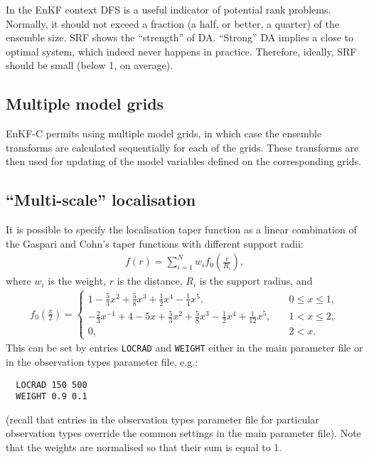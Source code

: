 \documentclass[11pt]{report}
\begin{document}
In the EnKF context DFS is a useful indicator of potential rank problems.
Normally, it should not exceed a fraction (a half, or better, a quarter) of the ensemble size.
SRF shows the ``strength'' of DA.
``Strong'' DA implies a close to optimal system, which indeed never happens in practice.
Therefore, ideally, SRF should be small (below 1, on average).

\subsection{Multiple model grids}

EnKF-C permits using multiple model grids, in which case the ensemble transforms are calculated sequentially for each of the grids.
These transforms are then used for updating of the model variables defined on the corresponding grids.

\subsection {``Multi-scale'' localisation}

It is possible to specify the localisation taper function as a linear combination of the Gaspari and Cohn's taper functions with different support radii:
\begin{align*}
  f(r) = \sum_{i=1}^N w_i f_0(\frac{r}{R_i}),
\end{align*}
where $w_i$ is the weight, $r$ is the distance, $R_i$ is the support radius, and
\begin{align*}
  f_0(\frac{x}{2}) = \left\{
  \begin{array}{ll}
    1 - \frac{5}{3} x^2 + \frac{5}{8} x^3 + \frac{1}{2} x^4 -\frac{1}{4} x^5, \quad & 0 \le x \le 1,\\
    -\frac{2}{3} x^{-1} + 4 - 5x + \frac{5}{3}x^2 + \frac{5}{8}x^3 - \frac{1}{2} x^4 + \frac{1}{12}x^5, \quad & 1 < x \le 2,\\
    0, \quad & 2 < x.
  \end{array}
  \right.
\end{align*}
This can be set by entries \verb|LOCRAD| and \verb|WEIGHT| either in the main parameter file or in the observation types parameter file, e.g.:
\begin{Verbatim}
  LOCRAD 150 500
  WEIGHT 0.9 0.1
\end{Verbatim}
(recall that entries in the observation types parameter file for particular observation types override the common settings in the main parameter file).
Note that the weights are normalised so that their sum is equal to 1.
\end{document}

